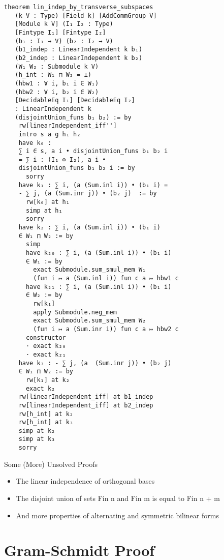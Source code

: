 \documentclass{beamer}
\begin{document}
\begin{verbatim}
theorem lin_indep_by_transverse_subspaces
   (k V : Type) [Field k] [AddCommGroup V] 
   [Module k V] (I₁ I₂ : Type)
   [Fintype I₁] [Fintype I₂]
   (b₁ : I₁ → V) (b₂ : I₂ → V)
   (b1_indep : LinearIndependent k b₁)
   (b2_indep : LinearIndependent k b₂)
   (W₁ W₂ : Submodule k V)
   (h_int : W₁ ⊓ W₂ = ⊥)
   (hbw1 : ∀ i, b₁ i ∈ W₁)
   (hbw2 : ∀ i, b₂ i ∈ W₂)
   [DecidableEq I₁] [DecidableEq I₂]
   : LinearIndependent k 
   (disjointUnion_funs b₁ b₂) := by
    rw[linearIndependent_iff'']
    intro s a g h₁ h₂
    have k₀ : 
    ∑ i ∈ s, a i • disjointUnion_funs b₁ b₂ i 
    = ∑ i : (I₁ ⊕ I₂), a i • 
    disjointUnion_funs b₁ b₂ i := by
      sorry
    have k₁ : ∑ i, (a (Sum.inl i)) • (b₁ i) = 
    - ∑ j, (a (Sum.inr j)) • (b₂ j)  := by
      rw[k₀] at h₁
      simp at h₁
      sorry
    have k₂ : ∑ i, (a (Sum.inl i)) • (b₁ i) 
    ∈ W₁ ⊓ W₂ := by
      simp
      have k₂₀ : ∑ i, (a (Sum.inl i)) • (b₁ i) 
      ∈ W₁ := by
        exact Submodule.sum_smul_mem W₁ 
        (fun i ↦ a (Sum.inl i)) fun c a ↦ hbw1 c
      have k₂₁ : ∑ i, (a (Sum.inl i)) • (b₁ i) 
      ∈ W₂ := by
        rw[k₁]
        apply Submodule.neg_mem
        exact Submodule.sum_smul_mem W₂ 
        (fun i ↦ a (Sum.inr i)) fun c a ↦ hbw2 c
      constructor
      · exact k₂₀
      · exact k₂₁
    have k₃ : - ∑ j, (a  (Sum.inr j)) • (b₂ j) 
    ∈ W₁ ⊓ W₂ := by
      rw[k₁] at k₂
      exact k₂
    rw[linearIndependent_iff] at b1_indep
    rw[linearIndependent_iff] at b2_indep
    rw[h_int] at k₂
    rw[h_int] at k₃
    simp at k₂
    simp at k₃
    sorry
\end{verbatim}




\begin{frame} {Some (More) Unsolved Proofs}
\begin{itemize}
    \item The linear independence of orthogonal bases
    \item The disjoint union of sets Fin n and Fin m is equal to Fin n + m
    \item And more properties of alternating and symmetric bilinear forms
\end{itemize}
\end{frame} 




\section{Gram-Schmidt Proof}
\end{document}
